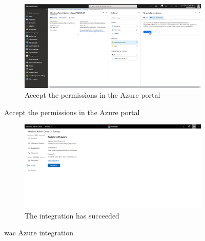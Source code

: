 \begin{figure}[h]\ContinuedFloat
\begin{subfigure}{\textwidth}
		\captionsetup{width=0.7\linewidth}
		\includegraphics[width=0.75\linewidth]{img/StandVanZaken/WAC3.png} 
		\centering
		\caption{Accept the permissions in the Azure portal}
	\end{subfigure}
\end{figure}
\begin{figure}[h]\ContinuedFloat
	\begin{subfigure}{\textwidth}
		\captionsetup{width=0.7\linewidth}
		\includegraphics[width=0.75\linewidth]{img/StandVanZaken/WAC4.png}
		\centering
		\caption{The integration has succeeded}
	\end{subfigure}
	\caption[WAC Azure integration]{\acrlong{wac} Azure integration}
	\label{fig:WACAzure}
\end{figure}
